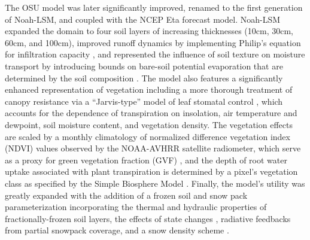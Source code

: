 The OSU model was later significantly improved, renamed to the first generation of Noah-LSM, and coupled with the NCEP Eta forecast model. Noah-LSM expanded the domain to four soil layers of increasing thicknesses (10cm, 30cm, 60cm, and 100cm), improved runoff dynamics by implementing Philip's equation for infiltration capacity \parencite{schaake_simple_1996}, and represented the influence of soil texture on moisture transport by introducing bounds on bare-soil potential evaporation that are determined by the soil composition \parencite{betts_assessment_1997} \parencite{mahfouf_comparative_1991}. The model also features a significantly enhanced representation of vegetation including a more thorough treatment of canopy resistance via a ``Jarvis-type'' model of leaf stomatal control \parencite{jarvis_interpretation_1976} \parencite{jacquemin_sensitivity_1990}, which accounts for the dependence of transpiration on insolation, air temperature and dewpoint, soil moisture content, and vegetation density. The vegetation effects are scaled by a monthly climatology of normalized difference vegetation index (NDVI) values observed by the NOAA-AVHRR satellite radiometer, which serve as a proxy for green vegetation fraction (GVF) \parencite{gutman_derivation_1998} \parencite{chen_modeling_1996}, and the depth of root water uptake associated with plant transpiration is determined by a pixel's vegetation class as specified by the Simple Biosphere Model \parencite{dorman_global_1989}. Finally, the model's utility was greatly expanded with the addition of a frozen soil and snow pack parameterization incorporating the thermal and hydraulic properties of fractionally-frozen soil layers, the effects of state changes \parencite{koren_parameterization_1999}, radiative feedbacks from partial snowpack coverage, and a snow density scheme \parencite{ek_implementation_2003}.


